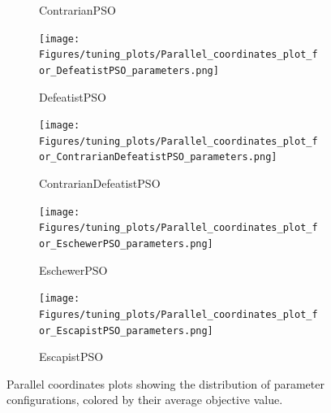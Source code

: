 \begin{figure}[H]
\begin{subfigure}{0.49\textwidth}
        \caption{ContrarianPSO}
    \end{subfigure}
        \begin{subfigure}{0.49\textwidth}
        \centering
        \texttt{[image: Figures/tuning\_plots/Parallel\_coordinates\_plot\_for\_DefeatistPSO\_parameters.png]}
        \caption{DefeatistPSO}
    \end{subfigure}
      \begin{subfigure}{0.49\textwidth}
        \centering
        \texttt{[image: Figures/tuning\_plots/Parallel\_coordinates\_plot\_for\_ContrarianDefeatistPSO\_parameters.png]}
        \caption{ContrarianDefeatistPSO}
    \end{subfigure}
        \begin{subfigure}{0.49\textwidth}
        \centering
        \texttt{[image: Figures/tuning\_plots/Parallel\_coordinates\_plot\_for\_EschewerPSO\_parameters.png]}
        \caption{EschewerPSO}
    \end{subfigure}
    \begin{subfigure}{0.49\textwidth}
        \centering
        \texttt{[image: Figures/tuning\_plots/Parallel\_coordinates\_plot\_for\_EscapistPSO\_parameters.png]}
        \caption{EscapistPSO}
    \end{subfigure}
            \captionsetup{list=no}
\caption[Parallel coordinates plots of parameter configurations]{Parallel coordinates plots showing the distribution of  parameter configurations, colored by their average objective value.}
\end{figure}


